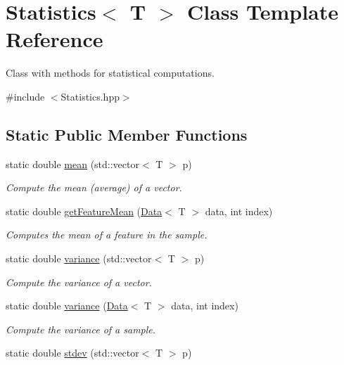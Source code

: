 \hypertarget{class_statistics}{}\section{Statistics$<$ T $>$ Class Template Reference}
\label{class_statistics}


Class with methods for statistical computations.  




{\ttfamily \#include $<$Statistics.\+hpp$>$}

\subsection*{Static Public Member Functions}
\begin{DoxyCompactItemize}
\item 
static double \mbox{\hyperlink{class_statistics_a5c3639c37f312703cdebfe179a3c5180}{mean}} (std\+::vector$<$ T $>$ p)
\begin{DoxyCompactList}\small\item\em Compute the mean (average) of a vector. \end{DoxyCompactList}\item 
static double \mbox{\hyperlink{class_statistics_a0e62b9652ef3e3827daaed01c48faaa0}{get\+Feature\+Mean}} (\mbox{\hyperlink{class_data}{Data}}$<$ T $>$ data, int index)
\begin{DoxyCompactList}\small\item\em Computes the mean of a feature in the sample. \end{DoxyCompactList}\item 
static double \mbox{\hyperlink{class_statistics_a9e5a038712e910978ee5c6dd3c16d0ee}{variance}} (std\+::vector$<$ T $>$ p)
\begin{DoxyCompactList}\small\item\em Compute the variance of a vector. \end{DoxyCompactList}\item 
static double \mbox{\hyperlink{class_statistics_a02f605eec578754e63de82acce5a3f34}{variance}} (\mbox{\hyperlink{class_data}{Data}}$<$ T $>$ data, int index)
\begin{DoxyCompactList}\small\item\em Compute the variance of a sample. \end{DoxyCompactList}\item 
static double \mbox{\hyperlink{class_statistics_accf969226645d2fe2cb16ab24c3eeb33}{stdev}} (std\+::vector$<$ T $>$ p)

\end{DoxyCompactItemize}
